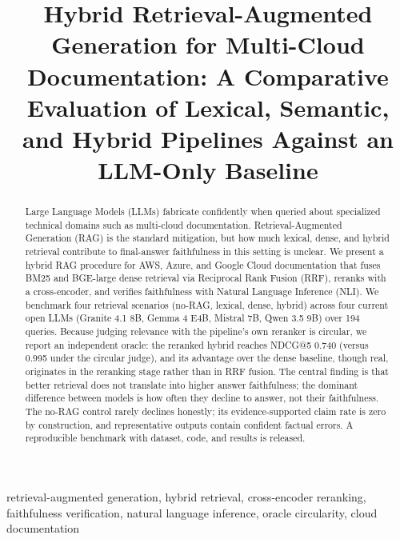 \documentclass[conference]{IEEEtran}
\begin{document}
\title{Hybrid Retrieval-Augmented Generation for Multi-Cloud Documentation: A Comparative Evaluation of Lexical, Semantic, and Hybrid Pipelines Against an LLM-Only Baseline}
\author{
\and
{}
}
\maketitle
{}
\IEEEpubidadjcol
\begin{abstract}
Large Language Models (LLMs) fabricate confidently when queried about specialized technical domains such as multi-cloud documentation. Retrieval-Augmented Generation (RAG) is the standard mitigation, but how much lexical, dense, and hybrid retrieval contribute to final-answer faithfulness in this setting is unclear. We present a hybrid RAG procedure for AWS, Azure, and Google Cloud documentation that fuses BM25 and BGE-large dense retrieval via Reciprocal Rank Fusion (RRF), reranks with a cross-encoder, and verifies faithfulness with Natural Language Inference (NLI). We benchmark four retrieval scenarios (no-RAG, lexical, dense, hybrid) across four current open LLMs (Granite 4.1 8B, Gemma 4 E4B, Mistral 7B, Qwen 3.5 9B) over 194 queries. Because judging relevance with the pipeline's own reranker is circular, we report an independent oracle: the reranked hybrid reaches NDCG@5 0.740 (versus 0.995 under the circular judge), and its advantage over the dense baseline, though real, originates in the reranking stage rather than in RRF fusion. The central finding is that better retrieval does not translate into higher answer faithfulness; the dominant difference between models is how often they decline to answer, not their faithfulness. The no-RAG control rarely declines honestly; its evidence-supported claim rate is zero by construction, and representative outputs contain confident factual errors. A reproducible benchmark with dataset, code, and results is released.
\end{abstract}
\begin{IEEEkeywords}
retrieval-augmented generation, hybrid retrieval, cross-encoder reranking, faithfulness verification, natural language inference, oracle circularity, cloud documentation
\end{IEEEkeywords}
\end{document}
